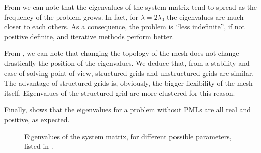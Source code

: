 From  we can note that the eigenvalues of
the system matrix tend to spread as the frequency of the problem
grows. In fact, for $\lambda = 2\lambda_0$ the eigenvalues are much
closer to each others. As a consequence, the problem is ``less
indefinite'', if not positive definite, and iterative methods perform better.

From , we can note that changing the
topology of the mesh does not change drastically the position of the
eigenvalues. We deduce that, from a stability and ease of solving
point of view, structured grids and unstructured grids are
similar. The advantage of structured grids is, obviously, the bigger
flexibility of the mesh itself. Eigenvalues of the structured grid are
more clustered for this reason.

Finally,  shows that the eigenvalues for a
problem without PMLs are all real and positive, as expected.

\begin{figure}[htbp]
  \begin{center}
  \end{center}
  \caption{Eigenvalues of the system matrix, for
    different possible parameters, listed in
    .}
  \label{fig:eigvals}
\end{figure}  


